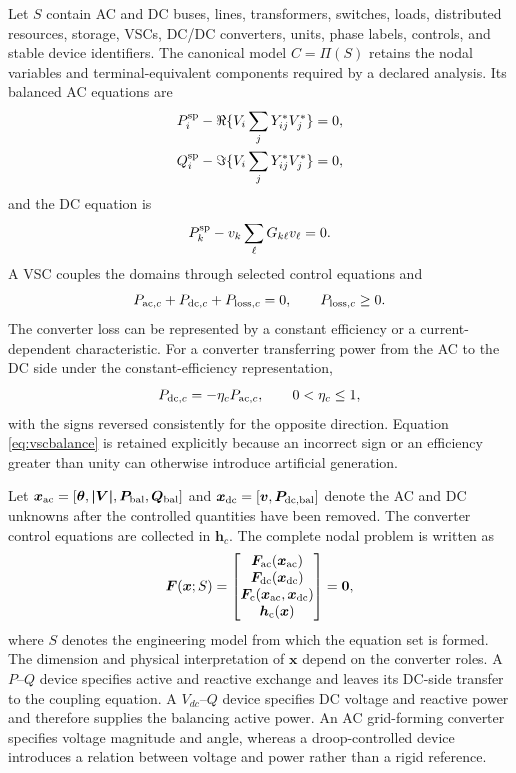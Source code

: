 \documentclass[final,5p,times,twocolumn]{elsarticle}
\newcommand{\Proj}{\Pi}
\begin{document}
Let $S$ contain AC and DC buses, lines, transformers, switches, loads,
distributed resources, storage, VSCs, DC/DC converters, units, phase labels,
controls, and stable device identifiers. The canonical model $C=\Proj(S)$
retains the nodal variables and terminal-equivalent components required by a
declared analysis. Its balanced AC equations are
\begin{align}
P_i^{\rm sp}-\Re\{V_i\sum_jY_{ij}^{*}V_j^{*}\}&=0,\\
Q_i^{\rm sp}-\Im\{V_i\sum_jY_{ij}^{*}V_j^{*}\}&=0,
\label{eq:acbalance}
\end{align}
and the DC equation is
\begin{equation}
P_k^{\rm sp}-v_k\sum_{\ell}G_{k\ell}v_{\ell}=0.
\label{eq:dcbalance}
\end{equation}
A VSC couples the domains through selected control equations and
\begin{equation}
P_{{\rm ac},c}+P_{{\rm dc},c}+P_{{\rm loss},c}=0,
\qquad P_{{\rm loss},c}\ge0.
\label{eq:vscbalance}
\end{equation}
The converter loss can be represented by a constant efficiency or a current-
dependent characteristic. For a converter transferring power from the AC to
the DC side under the constant-efficiency representation,
\begin{equation}
 P_{{\rm dc},c}=-\eta_c P_{{\rm ac},c}, \qquad
 0<\eta_c\le 1,
 \label{eq:efficiency}
\end{equation}
with the signs reversed consistently for the opposite direction. Equation
\eqref{eq:vscbalance} is retained explicitly because an incorrect sign or an
efficiency greater than unity can otherwise introduce artificial generation.

Let $\bm{x}_{\rm ac}=[\bm{\theta},\bm{|V|},\bm{P}_{\rm bal},
\bm{Q}_{\rm bal}]$ and $\bm{x}_{\rm dc}=[\bm{v},\bm{P}_{\rm dc,bal}]$ denote
the AC and DC unknowns after the controlled quantities have been removed. The
converter control equations are collected in $\bm{h}_c$. The complete nodal
problem is written as
\begin{equation}
 \bm{F}(\bm{x};S)=
 \begin{bmatrix}
 \bm{F}_{\rm ac}(\bm{x}_{\rm ac})\\
 \bm{F}_{\rm dc}(\bm{x}_{\rm dc})\\
 \bm{F}_{\rm c}(\bm{x}_{\rm ac},\bm{x}_{\rm dc})\\
 \bm{h}_{\rm c}(\bm{x})
 \end{bmatrix}=\bm{0},
 \label{eq:complete-residual}
\end{equation}
where $S$ denotes the engineering model from which the equation set is formed.
The dimension and physical interpretation of $\bm{x}$ depend on the converter
roles. A $P$--$Q$ device specifies active and reactive exchange and leaves its
DC-side transfer to the coupling equation. A $V_{dc}$--$Q$ device specifies DC
voltage and reactive power and therefore supplies the balancing active power.
An AC grid-forming converter specifies voltage magnitude and angle, whereas a
droop-controlled device introduces a relation between voltage and power rather
than a rigid reference.
\end{document}
